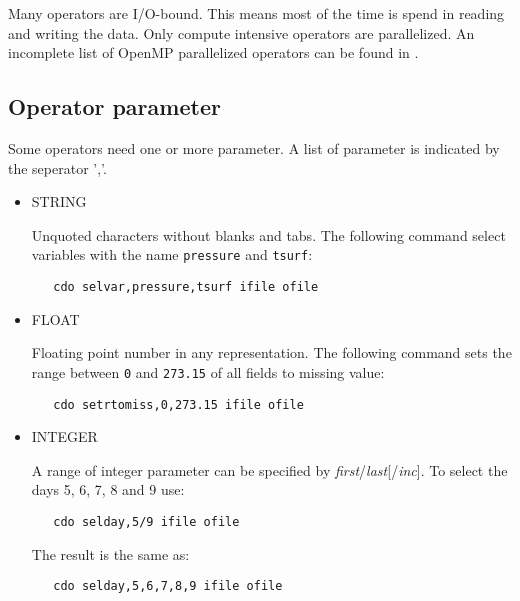 Many {\CDO} operators are I/O-bound. This means most of the time is spend in reading and writing the data. 
Only compute intensive {\CDO} operators are parallelized. 
An incomplete list of OpenMP parallelized operators can be found in .

\subsection{Operator parameter}

Some operators need one or more parameter. A list of parameter is indicated by the seperator ','.

\begin{itemize}
\item STRING

Unquoted characters without blanks and tabs.
The following command select variables with the name {\tt pressure} and {\tt tsurf}:
\begin{verbatim}
   cdo selvar,pressure,tsurf ifile ofile
\end{verbatim}

\item FLOAT

Floating point number in any representation.
The following command sets the range between {\tt 0} and {\tt 273.15}
of all fields to missing value:
\begin{verbatim}
   cdo setrtomiss,0,273.15 ifile ofile
\end{verbatim}

\item INTEGER

A range of integer parameter can be specified by {\it first}/{\it last}[/{\it inc}].
To select the days 5, 6, 7, 8 and 9 use:
\begin{verbatim}
   cdo selday,5/9 ifile ofile
\end{verbatim}
The result is the same as:
\begin{verbatim}
   cdo selday,5,6,7,8,9 ifile ofile
\end{verbatim}
\end{itemize}



